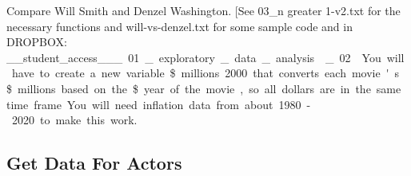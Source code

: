\documentclass[
]{article}
\newenvironment{Shaded}{\begin{snugshade}}{\end{snugshade}}
\newcommand{\CommentTok}[1]{\textcolor[rgb]{0.56,0.35,0.01}{\textit{#1}}}
\newcommand{\DataTypeTok}[1]{\textcolor[rgb]{0.13,0.29,0.53}{#1}}
\newcommand{\FloatTok}[1]{\textcolor[rgb]{0.00,0.00,0.81}{#1}}
\newcommand{\KeywordTok}[1]{\textcolor[rgb]{0.13,0.29,0.53}{\textbf{#1}}}
\newcommand{\NormalTok}[1]{#1}
\newcommand{\OperatorTok}[1]{\textcolor[rgb]{0.81,0.36,0.00}{\textbf{#1}}}
\newcommand{\StringTok}[1]{\textcolor[rgb]{0.31,0.60,0.02}{#1}}
\begin{document}
Compare Will Smith and Denzel Washington. {[}See 03\_n greater 1-v2.txt
for the necessary functions and will-vs-denzel.txt for some sample code
and in DROPBOX:
\_\_student\_access\_\_\unit\_01\_exploratory\_data\_analysis\week\_02\imdbexample {]}
You will have to create a new variable \$millions.2000 that converts
each movie's \$millions based on the \$year of the movie, so all dollars
are in the same time frame. You will need inflation data from about
1980-2020 to make this work.

\hypertarget{get-data-for-actors}{%
\subsection{Get Data For Actors}\label{get-data-for-actors}}

\begin{Shaded}
\end{Shaded}
\end{document}
